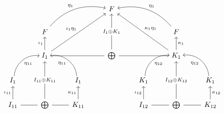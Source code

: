 
\[
\begin{tikzcd}
                                                          &                                                                                   &                                                          & F                                                      &                                                           &                                                                                       &                                                          \\
                                                          & F \arrow[rru, "\eta_{1}", bend left]                                              &                                                          &                                                        &                                                           & F \arrow[llu, "\eta_{1}"', bend right]                                                &                                                          \\
                                                          & I_{1} \arrow[u, "\iota_{1}"] \arrow[rr, dash] \arrow[rruu, "\iota_{1}\eta_{1}"] &                                                          & \bigoplus \arrow[uu, "I_{1} \oplus K_{1}" description] &                                                           & K_{1} \arrow[u, "\kappa_{1}"'] \arrow[ll, dash] \arrow[lluu, "\kappa_{1}\eta_{1}"'] &                                                          \\
I_{1} \arrow[ru, "\eta_{11}"', bend left=49, shift right] &                                                                                   & I_{1} \arrow[lu, "\eta_{11}", bend right=49, shift left] &                                                        & K_{1} \arrow[ru, "\eta_{12}"', bend left=49, shift right] &                                                                                       & K_{1} \arrow[lu, "\eta_{12}", bend right=49, shift left] \\
I_{11} \arrow[u, "\iota_{11}"] \arrow[r, dash]          & \bigoplus \arrow[uu, "I_{11}\oplus K_{11}" description]                           & K_{11} \arrow[u, "\kappa_{11}"] \arrow[l, dash]        &                                                        & I_{12} \arrow[u, "\iota_{12}"] \arrow[r, dash]          & \bigoplus \arrow[uu, "I_{12} \oplus K_{12}" description]                              & K_{12} \arrow[u, "\kappa_{12}"'] \arrow[l, dash]      
\end{tikzcd}
\]


